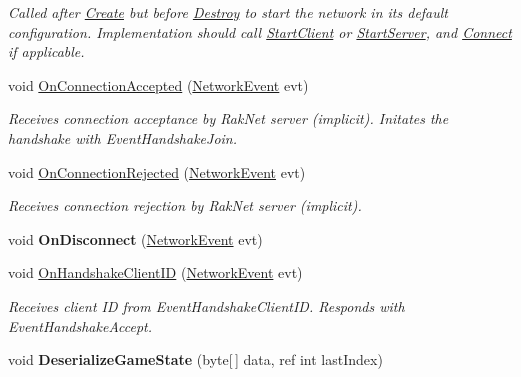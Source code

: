 \begin{DoxyCompactItemize}
\begin{DoxyCompactList}\small\item\em Called after \hyperlink{class_skyrates_1_1_common_1_1_network_1_1_network_common_a575172eb9f965e181e19649bcce38ca0}{Create} but before \hyperlink{class_skyrates_1_1_common_1_1_network_1_1_network_common_aa00266a16aa27dfd0eb242c74856a92a}{Destroy} to start the network in its default configuration. Implementation should call \hyperlink{class_skyrates_1_1_common_1_1_network_1_1_network_common_a982b732d621ff3f8738319053af8d154}{Start\-Client} or \hyperlink{class_skyrates_1_1_common_1_1_network_1_1_network_common_ac1209cf3fc31d2f145678971472ec20c}{Start\-Server}, and \hyperlink{class_skyrates_1_1_common_1_1_network_1_1_network_common_aa11961a4a6dc22c782552eb96e27c6e1}{Connect} if applicable.  \end{DoxyCompactList}\item 
void \hyperlink{class_skyrates_1_1_client_1_1_network_1_1_client_a8e264c8e627eace760e2a110b2b39a69}{On\-Connection\-Accepted} (\hyperlink{class_skyrates_1_1_common_1_1_network_1_1_event_1_1_network_event}{Network\-Event} evt)
\begin{DoxyCompactList}\small\item\em Receives connection acceptance by Rak\-Net server (implicit). Initates the handshake with Event\-Handshake\-Join. \end{DoxyCompactList}\item 
void \hyperlink{class_skyrates_1_1_client_1_1_network_1_1_client_ac010eecabdf4397ad93d9cae5ea60445}{On\-Connection\-Rejected} (\hyperlink{class_skyrates_1_1_common_1_1_network_1_1_event_1_1_network_event}{Network\-Event} evt)
\begin{DoxyCompactList}\small\item\em Receives connection rejection by Rak\-Net server (implicit). \end{DoxyCompactList}\item 
\hypertarget{class_skyrates_1_1_client_1_1_network_1_1_client_a55896d8aa53f613e8b12aa20f5ae8480}{void {\bfseries On\-Disconnect} (\hyperlink{class_skyrates_1_1_common_1_1_network_1_1_event_1_1_network_event}{Network\-Event} evt)}\label{class_skyrates_1_1_client_1_1_network_1_1_client_a55896d8aa53f613e8b12aa20f5ae8480}

\item 
void \hyperlink{class_skyrates_1_1_client_1_1_network_1_1_client_a8ef146c33d3ed104d0f937896964d4b2}{On\-Handshake\-Client\-I\-D} (\hyperlink{class_skyrates_1_1_common_1_1_network_1_1_event_1_1_network_event}{Network\-Event} evt)
\begin{DoxyCompactList}\small\item\em Receives client I\-D from Event\-Handshake\-Client\-I\-D. Responds with Event\-Handshake\-Accept. \end{DoxyCompactList}\item 
\hypertarget{class_skyrates_1_1_client_1_1_network_1_1_client_acb5b8d01c41f570e3e419eee28b39284}{void {\bfseries Deserialize\-Game\-State} (byte\mbox{[}$\,$\mbox{]} data, ref int last\-Index)}\label{class_skyrates_1_1_client_1_1_network_1_1_client_acb5b8d01c41f570e3e419eee28b39284}


\end{DoxyCompactItemize}
